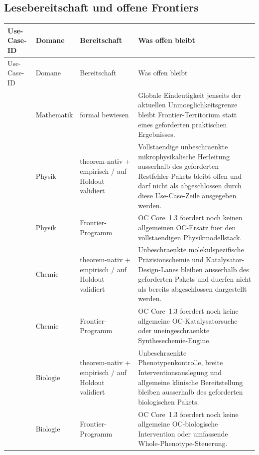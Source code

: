 \subsection{Lesebereitschaft und offene Frontiers}
\begin{longtable}{@{}L{0.15\textwidth}L{0.12\textwidth}L{0.13\textwidth}L{0.50\textwidth}@{}}
\toprule
Use-Case-ID & Domane & Bereitschaft & Was offen bleibt \\
\midrule
\endfirsthead
\toprule
Use-Case-ID & Domane & Bereitschaft & Was offen bleibt \\
\midrule
\endhead
{} & Mathematik & formal bewiesen & Globale Eindeutigkeit jenseits der aktuellen Unmoeglichkeitsgrenze bleibt Frontier-Territorium statt eines geforderten praktischen Ergebnisses. \\
 & Physik & theorem-nativ + empirisch / auf Holdout validiert & Vollstaendige unbeschraenkte mikrophysikalische Herleitung ausserhalb des geforderten Restfehler-Pakets bleibt offen und darf nicht als abgeschlossen durch diese Use-Case-Zeile ausgegeben werden. \\
 & Physik & Frontier-Programm & OC Core~1.3 foerdert noch keinen allgemeinen OC-Ersatz fuer den vollstaendigen Physikmodellstack. \\
 & Chemie & theorem-nativ + empirisch / auf Holdout validiert & Unbeschraenkte molekulspezifische Präzisionschemie und Katalysator-Design-Lanes bleiben ausserhalb des geforderten Pakets und duerfen nicht als bereits abgeschlossen dargestellt werden. \\
 & Chemie & Frontier-Programm & OC Core~1.3 foerdert noch keine allgemeine OC-Katalysatorsuche oder uneingeschraenkte Synthesechemie-Engine. \\
 & Biologie & theorem-nativ + empirisch / auf Holdout validiert & Unbeschraenkte Phenotypenkontrolle, breite Interventionsauslegung und allgemeine klinische Bereitstellung bleiben ausserhalb des geforderten biologischen Pakets. \\
 & Biologie & Frontier-Programm & OC Core~1.3 foerdert noch keine allgemeine OC-biologische Intervention oder umfassende Whole-Phenotype-Steuerung. \\

\end{longtable}
